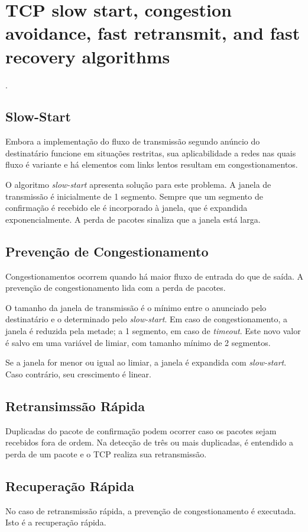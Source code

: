 
\chapter{TCP slow start, congestion avoidance, fast retransmit, and fast recovery algorithms}
 \cite{stevens1997tcp}.


\section*{Slow-Start}

Embora a implementação do fluxo de transmissão segundo anúncio do destinatário 
funcione em situações restritas, sua aplicabilidade a redes nas quais fluxo é 
variante e há elementos com links lentos resultam em congestionamentos.

O algoritmo \textit{slow-start} apresenta solução para este problema. A janela 
de transmissão é inicialmente de 1 segmento. Sempre que um segmento de 
confirmação é recebido ele é incorporado à janela, que é expandida 
exponencialmente. A perda de pacotes sinaliza que a janela está larga.


\section*{Prevenção de Congestionamento}

Congestionamentos ocorrem quando há maior fluxo de entrada do que de saída. A 
prevenção de congestionamento lida com a perda de pacotes.

O tamanho da janela de transmissão é o mínimo entre o anunciado pelo 
destinatário e o determinado pelo \textit{slow-start}. Em caso de 
congestionamento, a janela é reduzida pela metade; a 1 segmento, em caso de 
\textit{timeout}. Este novo valor é salvo em uma variável de limiar, com tamanho 
mínimo de 2 segmentos.

Se a janela for menor ou igual ao limiar, a janela é expandida com 
\textit{slow-start}. Caso contrário, seu crescimento é linear.


\section*{Retransimssão Rápida}

Duplicadas do pacote de confirmação podem ocorrer caso os pacotes sejam 
recebidos fora de ordem. Na detecção de três ou mais duplicadas, é entendido a
perda de um pacote e o TCP realiza sua retransmissão.


\section*{Recuperação Rápida}

No caso de retransmissão rápida, a prevenção de congestionamento é executada. 
Isto é a recuperação rápida.
